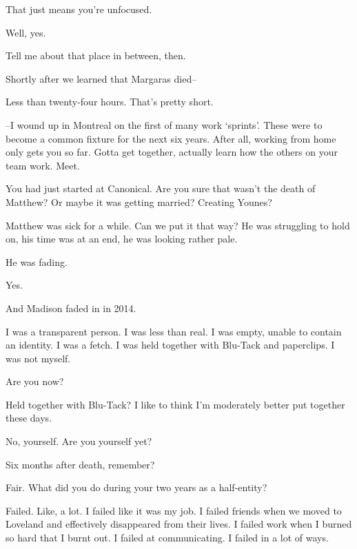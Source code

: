\begin{ally}
That just means you're unfocused.
\end{ally}
Well, yes.

\begin{ally}
Tell me about that place in between, then.
\end{ally}
\newpage

Shortly after we learned that Margaras died--

\begin{ally}
Less than twenty-four hours. That's pretty short.
\end{ally}
--I wound up in Montreal on the first of many work `sprints'. These were to become a common fixture for the next six years. After all, working from home only gets you so far. Gotta get together, actually learn how the others on your team work. Meet.

\begin{ally}
You had just started at Canonical. Are you sure that wasn't the death of Matthew? Or maybe it was getting married? Creating Younes?
\end{ally}
Matthew was sick for a while. Can we put it that way? He was struggling to hold on, his time was at an end, he was looking rather pale.

\begin{ally}
He was fading.
\end{ally}
Yes.

\begin{ally}
And Madison faded in in 2014.
\end{ally}
I was a transparent person. I was less than real. I was empty, unable to contain an identity. I was a fetch. I was held together with Blu-Tack and paperclips. I was not myself.

\begin{ally}
Are you now?
\end{ally}
Held together with Blu-Tack? I like to think I'm moderately better put together these days.

\begin{ally}
No, yourself. Are you yourself yet?
\end{ally}
Six months after death, remember?

\begin{ally}
Fair. What did you do during your two years as a half-entity?
\end{ally}
Failed. Like, a lot. I failed like it was my job. I failed friends when we moved to Loveland and effectively disappeared from their lives. I failed work when I burned so hard that I burnt out. I failed at communicating. I failed in a lot of ways.

